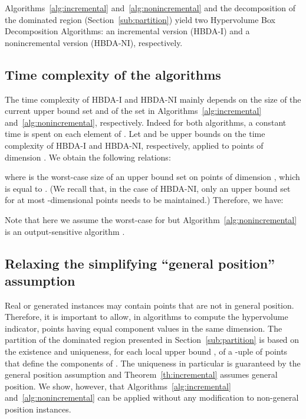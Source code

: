 \documentclass[a4paper,11pt]{article}
\begin{document}
\bigskip

Algorithms~\ref{alg:incremental} and~\ref{alg:nonincremental}
and the decomposition of the dominated region (Section~\ref{sub:partition})
yield two Hypervolume Box Decomposition Algorithms:
an incremental version (HBDA-I) and a nonincremental version
(HBDA-NI), respectively.

\subsection{Time complexity of the algorithms}\label{sub:time-complex}

The time complexity of HBDA-I and HBDA-NI 
mainly depends on the size of the current upper bound set  and of the set 
in Algorithms~\ref{alg:incremental} and~\ref{alg:nonincremental}, respectively.
Indeed for both algorithms, a constant time is spent on each element of .
Let  and  be upper bounds 
on the time complexity of HBDA-I and HBDA-NI,
respectively,
applied to  points of dimension .
We obtain the following relations:

where  is the worst-case size of an upper bound set 
on  points of dimension , which is equal to  \citep{KapRubShaVer08}.
(We recall that, in the case of HBDA-NI, only an upper bound set 
for at most  -dimensional points needs to be maintained.)
Therefore, we have:


Note that here we assume the worst-case for 
but Algorithm~\ref{alg:nonincremental} is an output-sensitive algorithm \citep{KapRubShaVer08}.



\subsection{Relaxing the simplifying ``general position'' assumption}\label{sub:NGP}

Real or generated instances may contain points that are not in general position. 
Therefore, it is important to allow, in algorithms to compute the hypervolume indicator, 
points having equal component values in the same dimension.
The partition of the dominated region presented in Section~\ref{sub:partition}
is based on the existence and uniqueness, for each local upper bound ,
of a -uple of points that define the  components of .
The uniqueness in particular is guaranteed by the general position assumption
and Theorem~\ref{th:incremental} assumes general position.
We show, however, that Algorithms~\ref{alg:incremental} and~\ref{alg:nonincremental}
can be applied without any modification to non-general position instances.
\end{document}
